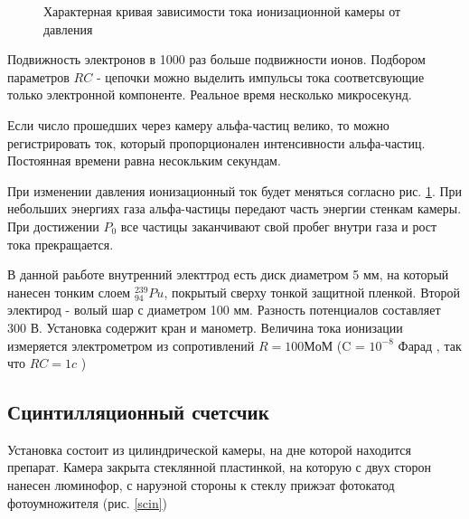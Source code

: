 \documentclass[a4paper]{article}
\begin{document}
\begin{figure}[h]
\begin{center}
\begin{minipage}[h]{0.3\linewidth}
    \caption{Характерная кривая зависимости тока ионизационной камеры от давления}
    \label{iotp}
    \end{minipage}
    \end{center}
\end{figure}

Подвижность электронов в 1000 раз больше подвижности ионов. Подбором параметров $RC$ - цепочки
можно выделить импульсы тока соответсвующие только электронной компоненте. Реальное время несколько микросекунд. \par 

Если число прошедших через камеру альфа-частиц велико, то можно регистрировать ток, который пропорционален 
интенсивности альфа-частиц. Постоянная времени равна несокльким секундам. \par 

При изменении давления ионизационный ток будет меняться согласно рис. \ref{iotp}. При небольших энергиях газа 
альфа-частицы передают часть энергии стенкам камеры. При достижении $P_0$ все частицы заканчивают свой пробег внутри газа и рост тока прекращается. \par

В данной раьботе внутренний электтрод есть диск диаметром 5 мм, на который нанесен тонким слоем $_{94}^{239}Pu$, покрытый сверху тонкой защитной пленкой.
Второй электирод - волый шар с диаметром 100 мм. Разность потенциалов составляет 300 В. Установка содержит кран и манометр. 
Величина тока ионизации измеряется электрометром из сопротивлений $R = 100 МоМ$ (C = $10^{-8}$ Фарад , так что $RC = 1c$ )



\subsection{Сцинтилляционный счетсчик}

Установка состоит из цилиндрической камеры, на дне которой находится препарат. Камера закрыта стеклянной пластинкой,
на которую с двух сторон нанесен люминофор, с наруэной стороны к стеклу прижэат фотокатод фотоумножителя (рис. \ref{scin})
\end{document}
